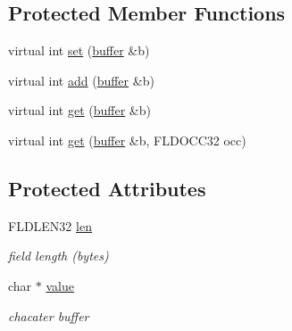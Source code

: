 \subsection*{Protected Member Functions}
\begin{DoxyCompactItemize}
\item 
virtual int \hyperlink{classatmi_1_1_tfield_3_01char_01_5_01_4_af7be84fbdff0665d9c94b83872b299b7}{set} (\hyperlink{classatmi_1_1buffer}{buffer} \&b)
\item 
virtual int \hyperlink{classatmi_1_1_tfield_3_01char_01_5_01_4_ae3036c038b361aee2fc357c1c7d1304a}{add} (\hyperlink{classatmi_1_1buffer}{buffer} \&b)
\item 
virtual int \hyperlink{classatmi_1_1_tfield_3_01char_01_5_01_4_a5df77c9bee99916f6d14f5beeec54dac}{get} (\hyperlink{classatmi_1_1buffer}{buffer} \&b)
\item 
virtual int \hyperlink{classatmi_1_1_tfield_3_01char_01_5_01_4_afaedd7d5902233652bed642bdceb9db1}{get} (\hyperlink{classatmi_1_1buffer}{buffer} \&b, F\+L\+D\+O\+C\+C32 occ)
\end{DoxyCompactItemize}
\subsection*{Protected Attributes}
\begin{DoxyCompactItemize}
\item 
F\+L\+D\+L\+E\+N32 \hyperlink{classatmi_1_1_tfield_3_01char_01_5_01_4_ab48401db01ecdb71e41bb929562cbaf2}{len}\hypertarget{classatmi_1_1_tfield_3_01char_01_5_01_4_ab48401db01ecdb71e41bb929562cbaf2}{}\label{classatmi_1_1_tfield_3_01char_01_5_01_4_ab48401db01ecdb71e41bb929562cbaf2}

\begin{DoxyCompactList}\small\item\em field length (bytes) \end{DoxyCompactList}\item 
char $\ast$ \hyperlink{classatmi_1_1_tfield_3_01char_01_5_01_4_a704b8534e0b8680f08b6dde5b06d2317}{value}\hypertarget{classatmi_1_1_tfield_3_01char_01_5_01_4_a704b8534e0b8680f08b6dde5b06d2317}{}\label{classatmi_1_1_tfield_3_01char_01_5_01_4_a704b8534e0b8680f08b6dde5b06d2317}

\begin{DoxyCompactList}\small\item\em chacater buffer \end{DoxyCompactList}\end{DoxyCompactItemize}



